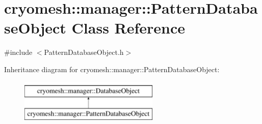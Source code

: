 \hypertarget{classcryomesh_1_1manager_1_1PatternDatabaseObject}{\section{cryomesh\-:\-:manager\-:\-:\-Pattern\-Database\-Object \-Class \-Reference}
\label{classcryomesh_1_1manager_1_1PatternDatabaseObject}
}


{\ttfamily \#include $<$\-Pattern\-Database\-Object.\-h$>$}

\-Inheritance diagram for cryomesh\-:\-:manager\-:\-:\-Pattern\-Database\-Object\-:\begin{figure}[H]
\begin{center}
\leavevmode
\includegraphics[height=2.000000cm]{classcryomesh_1_1manager_1_1PatternDatabaseObject}
\end{center}
\end{figure}
